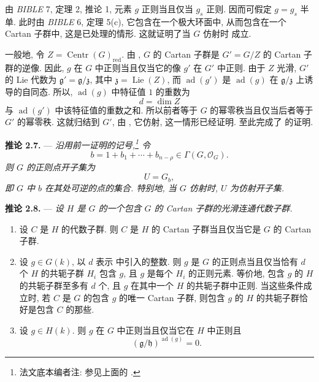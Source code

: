 由 \emph{BIBLE} 7, 定理 2, 推论 1, 元素 \(g\) 正则当且仅当 \(g_s\) 正则. 因而可假定 \(g=g_s\) 半单. 此时由 \emph{BIBLE} 6, 定理 5(c), 它包含在一个极大环面中, 从而包含在一个 Cartan 子群中, 这是已处理的情形. 这就证明了当 \(G\) 仿射时  成立.

一般地, 令 \(Z=\operatorname{Centr}(G)_{\mathrm{red}}\). 由 , \(G\) 的 Cartan 子群是 \(G'=G/Z\) 的 Cartan 子群的逆像. 因此, \(g\) 在 \(G\) 中正则当且仅当它的像 \(g'\) 在 \(G'\) 中正则. 由于 \(Z\) 光滑, \(G'\) 的 Lie 代数为 \(\mathfrak g'=\mathfrak g/\mathfrak z\), 其中 \(\mathfrak z=\operatorname{Lie}(Z)\), 而 \(\operatorname{ad}(g')\) 是 \(\operatorname{ad}(g)\) 在 \(\mathfrak g/\mathfrak z\) 上诱导的自同态. 所以, \(\operatorname{ad}(g)\) 中特征值 \(1\) 的重数为
\[
  d=\dim Z
\]
与 \(\operatorname{ad}(g')\) 中该特征值的重数之和. 所以前者等于 \(G\) 的幂零秩当且仅当后者等于 \(G'\) 的幂零秩. 这就归结到 \(G'\), 由 , 它仿射, 这一情形已经证明. 至此完成了  的证明.

\medskip
\noindent{}\textbf{推论 2.7.} ---
\textit{沿用前一证明的记号,\footnote{法文底本编者注: 参见上面的 .} 令}
\[
  b=1+b_1+\cdots+b_{n-\rho}\in\Gamma(G,\mathcal O_G).
\]
\textit{则 \(G\) 的正则点开子集为}
\[
  U=G_b,
\]
\textit{即 \(G\) 中 \(b\) 在其处可逆的点的集合. 特别地, 当 \(G\) 仿射时, \(U\) 为仿射开子集.}

\medskip
\noindent{}\textbf{推论 2.8.} ---
\textit{设 \(H\) 是 \(G\) 的一个包含 \(G\) 的 Cartan 子群的光滑连通代数子群.}

\begin{enumerate}
\item[\textit{a)}] 
  设 \(C\) 是 \(H\) 的代数子群. 则 \(C\) 是 \(H\) 的 Cartan 子群当且仅当它是 \(G\) 的 Cartan 子群.

\item[\textit{b)}] 
  设 \(g\in G(k)\), 以 \(d\) 表示  中引入的整数. 则 \(g\) 是 \(G\) 的正则点当且仅当恰有 \(d\) 个 \(H\) 的共轭子群 \(H_i\) 包含 \(g\), 且 \(g\) 是每个 \(H_i\) 的正则元素. 等价地, 包含 \(g\) 的 \(H\) 的共轭子群至多有 \(d\) 个, 且 \(g\) 在其中一个 \(H\) 的共轭子群中正则. 当这些条件成立时, 若 \(C\) 是 \(G\) 的包含 \(g\) 的唯一 Cartan 子群, 则包含 \(g\) 的 \(H\) 的共轭子群恰好是包含 \(C\) 的那些.

\item[\textit{c)}] 
  设 \(g\in H(k)\). 则 \(g\) 在 \(G\) 中正则当且仅当它在 \(H\) 中正则且
  \[
    (\mathfrak g/\mathfrak h)^{\operatorname{ad}(g)}=0.
  \]
\end{enumerate}

